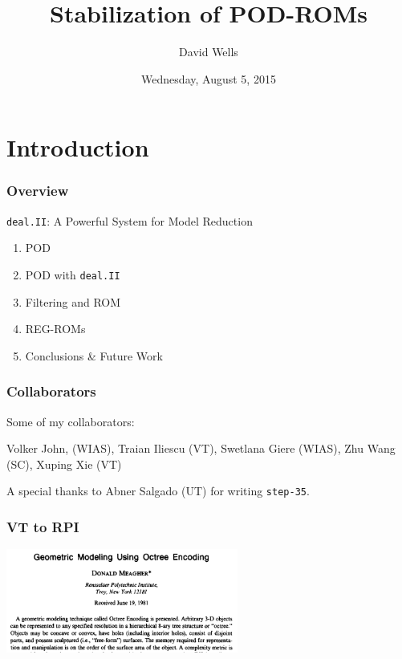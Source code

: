 \documentclass[mathserif]{beamer}
\title[Stabilization of POD-ROMs]{Stabilization of POD-ROMs}
\author[David Wells]{David Wells}
\institute{Virginia Tech/Rensselaer Polytechnic Institute}
\date{Wednesday, August 5, 2015}
\begin{document}
\frame{\titlepage}

\section{Introduction}

\begin{frame}
\frametitle{Overview}
    \begin{center}
        \texttt{deal.II}: A Powerful System for Model Reduction
    \end{center}

    \pause
    \begin{enumerate}
        \item POD
        \item POD with \texttt{deal.II}
        \item Filtering and ROM
        \item REG-ROMs
        \item Conclusions \& Future Work
    \end{enumerate}
\end{frame}

\begin{frame}
    \frametitle{Collaborators}
    Some of my collaborators:
    \begin{center}
        Volker John, (WIAS), Traian Iliescu (VT), Swetlana Giere (WIAS), Zhu Wang
        (SC), Xuping Xie (VT)
    \end{center}

    A special thanks to Abner Salgado (UT) for writing \texttt{step-35}.
\end{frame}

\begin{frame}
    \frametitle{VT to RPI}
    \begin{center}
        \includegraphics[width=3in]{../Pictures/octtree.png}
    \end{center}
\end{frame}
\end{document}
